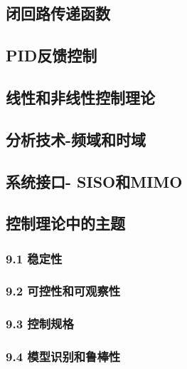 \subsection{闭回路传递函数}



\subsection{PID反馈控制}



\subsection{线性和非线性控制理论}



\subsection{分析技术-频域和时域}



\subsection{系统接口- SISO和MIMO}



\subsection{控制理论中的主题}

\subsubsection{9.1 稳定性}



\subsubsection{9.2 可控性和可观察性}



\subsubsection{9.3 控制规格}



\subsubsection{9.4 模型识别和鲁棒性}


